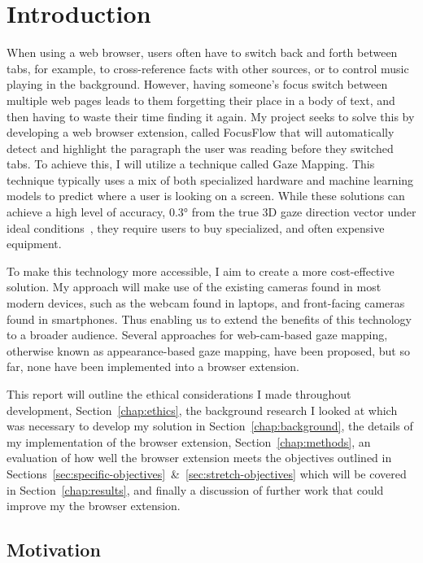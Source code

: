 \documentclass{report}
\begin{document}
\tableofcontents

\chapter{Introduction}
\label{chap:intro}
\noindent
When using a web browser, users often have to switch back and forth between tabs, for example, to cross-reference facts with other sources, or to control music playing in the background. However, having someone's focus switch between multiple web pages leads to them forgetting their place in a body of text, and then having to waste their time finding it again. My project seeks to solve this by developing a web browser extension, called FocusFlow that will automatically detect and highlight the paragraph the user was reading before they switched tabs. To achieve this, I will utilize a technique called Gaze Mapping. This technique typically uses a mix of both specialized hardware and machine learning models to predict where a user is looking on a screen. While these solutions can achieve a high level of accuracy, \(\ang{0.3}\) from the true 3D gaze direction vector under ideal conditions~\cite{tobiiprofusion}, they require users to buy specialized, and often expensive equipment.

To make this technology more accessible, I aim to create a more cost-effective solution. My approach will make use of the existing cameras found in most modern devices, such as the webcam found in laptops, and front-facing cameras found in smartphones. Thus enabling us to extend the benefits of this technology to a broader audience. Several approaches for web-cam-based gaze mapping, otherwise known as appearance-based gaze mapping, have been proposed, but so far, none have been implemented into a browser extension. 

This report will outline the ethical considerations I made throughout development, Section~\ref{chap:ethics}, the background research I looked at which was necessary to develop my solution in Section~\ref{chap:background}, the details of my implementation of the browser extension, Section~\ref{chap:methods}, an evaluation of how well the browser extension meets the objectives outlined in Sections~\ref{sec:specific-objectives}~\&~\ref{sec:stretch-objectives} which will be covered in Section~\ref{chap:results}, and finally a discussion of further work that could improve my the browser extension. 


\section{Motivation}
\end{document}
